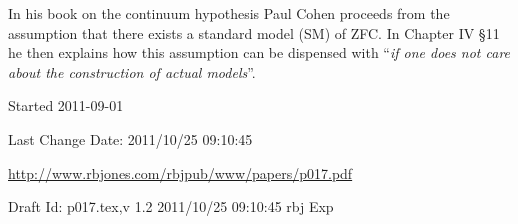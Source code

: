 \documentclass[10pt,titlepage]{article}
\begin{document}
In his book on the continuum hypothesis\cite{cohenSTCH} Paul Cohen proceeds from the assumption that there exists a standard model (SM) of ZFC.
In Chapter IV \S 11 he then explains how this assumption can be dispensed with ``\emph{if one does not care about the construction of actual models}''.






\label{index}
{\twocolumn[]
{\small\printindex}}

\vfill

\tiny{
Started 2011-09-01

Last Change $ $Date: 2011/10/25 09:10:45 $ $

\href{http://www.rbjones.com/rbjpub/www/papers/p017.pdf}{http://www.rbjones.com/rbjpub/www/papers/p017.pdf}

Draft $ $Id: p017.tex,v 1.2 2011/10/25 09:10:45 rbj Exp $ $
}%
\end{document}
